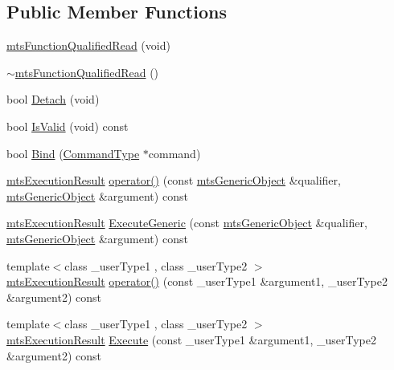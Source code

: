 \subsection*{Public Member Functions}
\begin{DoxyCompactItemize}
\item 
\hyperlink{classmts_function_qualified_read_a1776e3e0648e47435d9460b1e964140f}{mts\+Function\+Qualified\+Read} (void)
\item 
\hyperlink{classmts_function_qualified_read_a2d4381507c8d8b10f6b59187b6c67416}{$\sim$mts\+Function\+Qualified\+Read} ()
\item 
bool \hyperlink{classmts_function_qualified_read_a6e2358ffab4ae5da9acb8a4606c613f8}{Detach} (void)
\item 
bool \hyperlink{classmts_function_qualified_read_a521833fa551ad5e8f79492cd88d3df14}{Is\+Valid} (void) const 
\item 
bool \hyperlink{classmts_function_qualified_read_a0f89963fbe16521ab4d716c89a64d0c8}{Bind} (\hyperlink{classmts_function_qualified_read_ae78bcee54ee0392f510d2f33600c316f}{Command\+Type} $\ast$command)
\item 
\hyperlink{classmts_execution_result}{mts\+Execution\+Result} \hyperlink{classmts_function_qualified_read_a6a337f5f2c1f735f54b54b2610dd9c86}{operator()} (const \hyperlink{classmts_generic_object}{mts\+Generic\+Object} \&qualifier, \hyperlink{classmts_generic_object}{mts\+Generic\+Object} \&argument) const 
\item 
\hyperlink{classmts_execution_result}{mts\+Execution\+Result} \hyperlink{classmts_function_qualified_read_a7dd735595d526646a659c89e79d43c7b}{Execute\+Generic} (const \hyperlink{classmts_generic_object}{mts\+Generic\+Object} \&qualifier, \hyperlink{classmts_generic_object}{mts\+Generic\+Object} \&argument) const 
\item 
{\footnotesize template$<$class \+\_\+user\+Type1 , class \+\_\+user\+Type2 $>$ }\\\hyperlink{classmts_execution_result}{mts\+Execution\+Result} \hyperlink{classmts_function_qualified_read_a8c5c10827c54908449f9c969a79135f8}{operator()} (const \+\_\+user\+Type1 \&argument1, \+\_\+user\+Type2 \&argument2) const 
\item 
{\footnotesize template$<$class \+\_\+user\+Type1 , class \+\_\+user\+Type2 $>$ }\\\hyperlink{classmts_execution_result}{mts\+Execution\+Result} \hyperlink{classmts_function_qualified_read_aedfbc1198c539525c27c5ae5316e3fa0}{Execute} (const \+\_\+user\+Type1 \&argument1, \+\_\+user\+Type2 \&argument2) const 

\end{DoxyCompactItemize}
